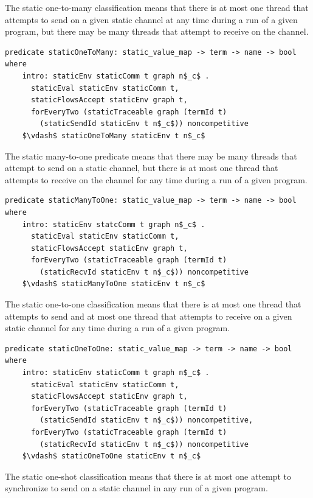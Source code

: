 \documentclass[letterpaper, 11pt]{report}
\begin{document}
The static one-to-many classification means that there is at most one thread that attempts to
send on a given static channel at any time during a run of a given program, but there may be
many threads that attempt to receive on the channel.

\begin{lstlisting}[language=logic, mathescape]
  predicate staticOneToMany: static_value_map -> term -> name -> bool where
    intro: staticEnv staticComm t graph n$_c$ .
      staticEval staticEnv staticComm t,
      staticFlowsAccept staticEnv graph t,
      forEveryTwo (staticTraceable graph (termId t)
        (staticSendId staticEnv t n$_c$)) noncompetitive
    $\vdash$ staticOneToMany staticEnv t n$_c$
\end{lstlisting}

The static many-to-one predicate means
that there may be many threads that attempt to send on a static channel, but there is at most
one thread that attempts to receive on the channel for any time during a run of a given
program.

\begin{lstlisting}[language=logic, mathescape]
  predicate staticManyToOne: static_value_map -> term -> name -> bool where
    intro: staticEnv statcComm t graph n$_c$ .
      staticEval staticEnv staticComm t,
      staticFlowsAccept staticEnv graph t,
      forEveryTwo (staticTraceable graph (termId t)
        (staticRecvId staticEnv t n$_c$)) noncompetitive
    $\vdash$ staticManyToOne staticEnv t n$_c$
\end{lstlisting}

The static one-to-one classification means that there is at most one thread that attempts to
send and at most one thread that attempts to receive on a given static channel for any time
during a run of a given program.

\begin{lstlisting}[language=logic, mathescape]
  predicate staticOneToOne: static_value_map -> term -> name -> bool where
    intro: staticEnv staticComm t graph n$_c$ .
      staticEval staticEnv staticComm t,
      staticFlowsAccept staticEnv graph t,
      forEveryTwo (staticTraceable graph (termId t)
        (staticSendId staticEnv t n$_c$)) noncompetitive, 
      forEveryTwo (staticTraceable graph (termId t)
        (staticRecvId staticEnv t n$_c$)) noncompetitive
    $\vdash$ staticOneToOne staticEnv t n$_c$
\end{lstlisting}

The static one-shot classification means that there is at most one attempt
to synchronize to send on a static channel in any run of a given program.
\end{document}
